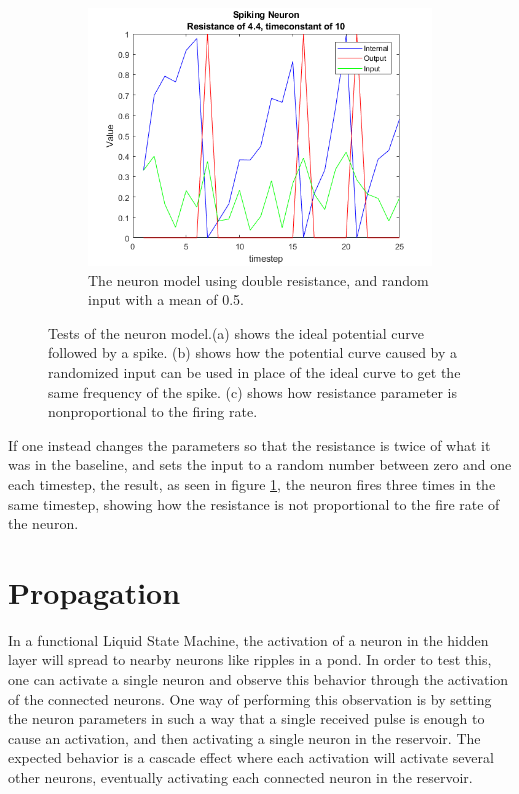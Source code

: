 \begin{figure}
\begin{subfigure}[b]{0.3\textwidth}
        \includegraphics[width=\textwidth]{Images/fast.png}
        \caption{The neuron model using double resistance, and random input with a mean of 0.5.}
        \label{fig:fast}
    \end{subfigure}
    \caption{Tests of the neuron model.(a) shows the ideal potential curve followed by a spike. (b) shows how the potential curve caused by a randomized input can be used in place of the ideal curve to get the same frequency of the spike. (c) shows how resistance parameter is nonproportional to the firing rate.}
    \label{fig:implementation_test}
\end{figure}

If one instead changes the parameters so that the resistance is twice of what it was in the baseline, and sets the input to a random number between zero and one each timestep, the result, as seen in figure \ref{fig:fast}, the neuron fires three times in the same timestep, showing how the resistance is not proportional to the fire rate of the neuron.

\section{Propagation}

In a functional Liquid State Machine, the activation of a neuron in the hidden layer will spread to nearby neurons like ripples in a pond. In order to test this, one can activate a single neuron and observe this behavior through the activation of the connected neurons. One way of performing this observation is by setting the neuron parameters in such a way that a single received pulse is enough to cause an activation, and then activating a single neuron in the reservoir. The expected behavior is a cascade effect where each activation will activate several other neurons, eventually activating each connected neuron in the reservoir.

